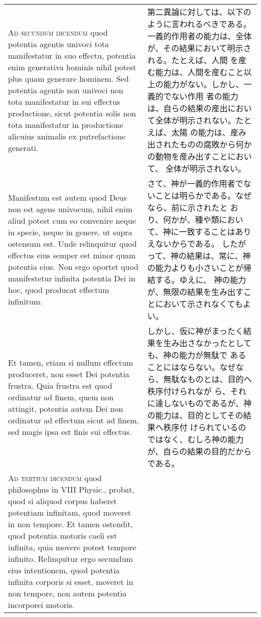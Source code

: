 \documentclass[10pt]{jsarticle} %
\begin{document}
\begin{longtable}{p{21em}p{21em}}
\\


{\scshape Ad secundum dicendum} quod potentia agentis univoci tota
 manifestatur in suo effectu, potentia enim generativa hominis nihil
 potest plus quam generare hominem. Sed potentia agentis non univoci non
 tota manifestatur in sui effectus productione, sicut potentia solis non
 tota manifestatur in productione alicuius animalis ex putrefactione
 generati. 


&

第二異論に対しては、以下のように言われるべきである。
一義的作用者の能力は、全体が、その結果において明示される。たとえば、人間
 を産む能力は、人間を産むこと以上の能力がない。しかし、一義的でない作用
 者の能力は、自らの結果の産出において全体が明示されない。たとえば、太陽
 の能力は、産み出されたものの腐敗から何かの動物を産み出すことにおいて、
 全体が明示されない。

\\


Manifestum est autem quod Deus non est agens univocum, nihil
 enim aliud potest cum eo convenire neque in specie, neque in genere, ut
 supra ostensum est. Unde relinquitur quod effectus eius semper est
 minor quam potentia eius. Non ergo oportet quod manifestetur infinita
 potentia Dei in hoc, quod producat effectum infinitum. 


&

さて、神が一義的作用者でないことは明らかである。なぜなら、前に示されたと
 おり、何かが、種や類において、神に一致することはありえないからである。
したがって、神の結果は、常に、神の能力よりも小さいことが帰結する。ゆえに、
 神の能力が、無限の結果を生み出すことにおいて示されなくてもよい。

\\


Et tamen, etiam
 si nullum effectum produceret, non esset Dei potentia frustra. Quia
 frustra est quod ordinatur ad finem, quem non attingit, potentia autem
 Dei non ordinatur ad effectum sicut ad finem, sed magis ipsa est finis
 sui effectus.


&

しかし、仮に神がまったく結果を生み出さなかったとしても、神の能力が無駄で
 あることにはならない。なぜなら、無駄なものとは、目的へ秩序付けられなが
 ら、それに達しないものであるが、神の能力は、目的としてその結果へ秩序付
 けられているのではなく、むしろ神の能力が、自らの結果の目的だからである。


\\


{\scshape Ad tertium dicendum} quod philosophus in VIII Physic., probat,
 quod si aliquod corpus haberet potentiam infinitam, quod moveret in non
 tempore. Et tamen ostendit, quod potentia motoris caeli est infinita,
 quia movere potest tempore infinito. Relinquitur ergo secundum eius
 intentionem, quod potentia infinita corporis si esset, moveret in non
 tempore, non autem potentia incorporei motoris. 


\end{longtable}
\end{document}
